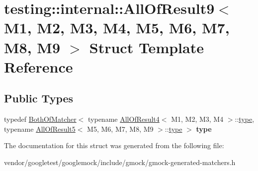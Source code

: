 \hypertarget{structtesting_1_1internal_1_1_all_of_result9}{}\section{testing\+:\+:internal\+:\+:All\+Of\+Result9$<$ M1, M2, M3, M4, M5, M6, M7, M8, M9 $>$ Struct Template Reference}
\label{structtesting_1_1internal_1_1_all_of_result9}
\subsection*{Public Types}
\begin{DoxyCompactItemize}
\item 
\mbox{\label{structtesting_1_1internal_1_1_all_of_result9_ade56e18d2e0b745968b87fc394710edc}} 
typedef \mbox{\hyperlink{classtesting_1_1internal_1_1_both_of_matcher}{Both\+Of\+Matcher}}$<$ typename \mbox{\hyperlink{structtesting_1_1internal_1_1_all_of_result4}{All\+Of\+Result4}}$<$ M1, M2, M3, M4 $>$\+::\mbox{\hyperlink{classtesting_1_1internal_1_1_both_of_matcher}{type}}, typename \mbox{\hyperlink{structtesting_1_1internal_1_1_all_of_result5}{All\+Of\+Result5}}$<$ M5, M6, M7, M8, M9 $>$\+::\mbox{\hyperlink{classtesting_1_1internal_1_1_both_of_matcher}{type}} $>$ {\bfseries type}
\end{DoxyCompactItemize}


The documentation for this struct was generated from the following file\+:\begin{DoxyCompactItemize}
\item 
vendor/googletest/googlemock/include/gmock/gmock-\/generated-\/matchers.\+h\end{DoxyCompactItemize}
